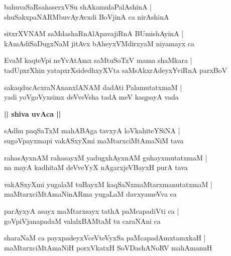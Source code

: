 \documentclass[twoside,12pt,openright]{book}
\newcounter{shloka}[chapter]
\def\uvaca#1{\centerline{{\large\textbf{#1}}}}
\begin{document}
\begin{shloka}%
bahuvaSaRsahaserxVSu shAkamulaPalAshinA |\\
shuSakxpaNARMbuvAyAvxdi BoVjinA ca nirAshinA
\end{shloka}

\begin{shloka}%
sitxrXVNAM saMdashaRnAlApavajiRnA BUmishAyinA |\\
kAmAdiSaDugxNaM jitAvx bAheyxVMdirxyaM niyamayx ca 
\end{shloka}

\begin{shloka}%
EvaM kaqteVpi neYvAtAmx saMtuSoTxV mama shaMkara |\\
tadUpxrXhin yatapxrXsidedhxyXVta saMsAkxrAdeyxYviRnA parxBoV 
\end{shloka}

\begin{shloka}%
sakaqducAcxraNAnanxlANAM dadAti PalamutatxmaM |\\
yadi yoVgoVyxsimx deVveVsha tadA meV kaqpayA vada
\end{shloka}

\uvaca{|| shiva uvAca ||}

\begin{shloka}%
sAdhu paqSaTxM mahABAga tavxyA loVkahiteYSiNA |\\
sugoVpayxmapi vakASxyXmi maMtarxciMtAmaNiM tava
\end{shloka}

\begin{shloka}%
rahasAyxnAM rahasayxM yadugxhAyxnAM guhayxmutatxmaM |\\
na mayA kadhitaM deVveYyX nAgarxjeVBayxH purA tava
\end{shloka}

\begin{shloka}%
vakASxyXmi yugalaM tuBayxM kaqSaNxmaMtarxmanutatxmaM |\\
maMtarxciMtAmaNinARma yugaLaM davxyameVva ca 
\end{shloka}

\begin{shloka}%
parAyxyA asayx maMtarxsayx tathA paMcapadiVti ca |\\
goVpiVjanapadaM valalxBAMtaM tu caraNAni ca 
\end{shloka}

\begin{shloka}%
sharaNaM ca payxpadeyxVceVteVyxSa paMcapadAmxtamxkaH |\\
maMtarxciMtAmaNiH porxVkatxH SoVDashANoRV mahAmanuH 
\end{shloka}
\end{document}
